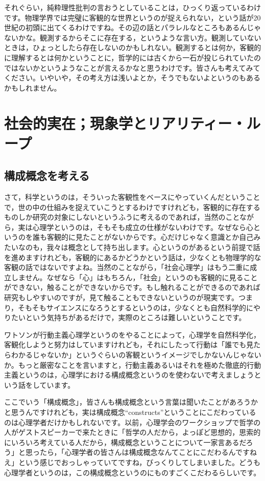 \documentclass{ltjsbook}
\begin{document}
それぐらい，純粋理性批判の言おうとしていることは，ひっくり返っているわけです。物理学界では完璧に客観的な世界というのが捉えられない，という話が20世紀の初頭に出てくるわけですね。その辺の話とパラレルなところもあるんじゃないかな。観測するからそこに存在する，というような言い方。観測していないときは，ひょっとしたら存在しないのかもしれない。観測するとは何か，客観的に理解するとは何かということに，哲学的には古くから一石が投じられていたのではないかというようなことが言えるかなと思うわけです。皆さんも考えてみてください。いやいや，その考え方は浅いよとか，そうでもないよというのもあるかもしれません。

\section{社会的実在；現象学とリアリティー・ループ}

\subsection{構成概念を考える}
さて，科学というのは，そういった客観性をベースにやっていくんだということで，世の中の仕組みを捉えていこうとするわけですけれども，客観的に存在するものしか研究の対象にしないというふうに考えるのであれば，当然のことながら，実は心理学というのは，そもそも成立の仕様がないわけです。なぜなら心というのを誰も客観的に見たことがないからです。心だけじゃなく意識とか自己みたいなのも，我々は概念として持ち出します。心というのがあるという前提で話を進めますけれども，客観的にあるかどうかという話は，少なくとも物理学的な客観の話ではないですよね。当然のことながら，「社会心理学」はもう二重に成立しません。なぜなら「心」はもちろん，「社会」というのも客観的に見ることができない，触ることができないからです。もし触れることができるのであれば研究もしやすいのですが，見て触ることもできないというのが現実です。つまり，そもそもサイエンスになろうとするというのは，少なくとも自然科学的にやりたいという気持ちがあるだけで，実際のところは難しいということです。

ワトソンが行動主義心理学というのをやることによって，心理学を自然科学化，客観化しようと努力はしていますけれども，それにしたって行動は「誰でも見たらわかるじゃないか」というぐらいの客観というイメージでしかないんじゃないか。もっと厳密なことを言いますと，行動主義あるいはそれを極めた徹底的行動主義というのは，心理学における構成概念というのを使わないで考えましょうという話をしています。

ここでいう「構成概念」，皆さんも構成概念という言葉は聞いたことがあろうかと思うんですけれども，実は構成概念``constructs''ということにこだわっているのは心理学者だけかもしれないです。以前，心理学会のワークショップで哲学の人がゲストスピーカーで来たときに「哲学の人だから，よっぽど思想的，思索的にいろいろ考えている人だから，構成概念ということについて一家言あるだろう」と思ったら，「心理学者の皆さんは構成概念なんてことにこだわるんですねえ」という感じでおっしゃっていてですね，びっくりしてしまいました。どうも心理学者というのは，この構成概念というのにものすごくこだわるらしいです。
\end{document}
